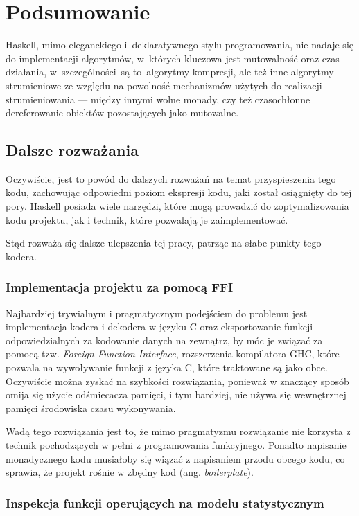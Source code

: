 \documentclass[../../praca.tex]{subfiles}
\begin{document}
\chapter{Podsumowanie}

Haskell, mimo eleganckiego i~deklaratywnego stylu programowania,
nie nadaje się do implementacji algorytmów, w~których kluczowa
jest mutowalność oraz czas działania, w~szczególności~są to~algorytmy
kompresji, ale też inne algorytmy strumieniowe ze względu na powolność
mechanizmów użytych do realizacji strumieniowania --- między innymi
wolne monady, czy też czasochłonne dereferowanie obiektów pozostających
jako mutowalne. 

\section{Dalsze rozważania}

Oczywiście, jest to powód do dalszych rozważań na temat przyspieszenia
tego kodu, zachowując odpowiedni poziom ekspresji kodu, jaki został
osiągnięty do tej pory. Haskell posiada wiele narzędzi, które mogą
prowadzić do zoptymalizowania kodu projektu, jak i technik, które
pozwalają je zaimplementować.

Stąd rozważa się dalsze ulepszenia tej pracy, patrząc na słabe punkty tego kodera.

\subsection{Implementacja projektu za pomocą FFI}

Najbardziej trywialnym i pragmatycznym podejściem do problemu jest
implementacja kodera i dekodera w języku C oraz eksportowanie funkcji
odpowiedzialnych za kodowanie danych na zewnątrz, by móc je związać
za pomocą tzw. \emph{Foreign Function Interface}, rozszerzenia kompilatora
GHC, które pozwala na wywoływanie funkcji z języka C, które traktowane 
są jako obce. Oczywiście można zyskać na szybkości rozwiązania,
ponieważ w znaczący sposób omija się użycie odśmiecacza pamięci,
i tym bardziej, nie używa się wewnętrznej pamięci środowiska
czasu wykonywania.

Wadą tego rozwiązania jest to, że mimo pragmatyzmu rozwiązanie nie korzysta
z technik pochodzących w pełni z programowania funkcyjnego.
Ponadto napisanie monadycznego kodu musiałoby się wiązać
z napisaniem przodu obcego kodu, co sprawia, że projekt
rośnie w zbędny kod (ang. \emph{boilerplate}).

\subsection{Inspekcja funkcji operujących na modelu statystycznym}
\end{document}
